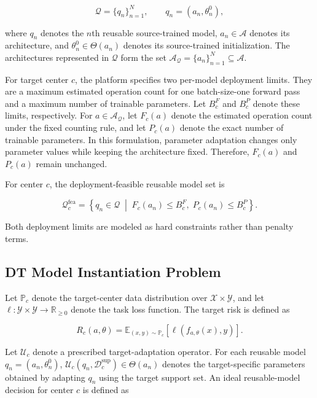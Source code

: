 \documentclass[a4paper,fleqn]{cas-sc}
\begin{document}
\begin{equation}
\mathcal{Q}=\{q_n\}_{n=1}^{N},
\qquad
q_n=(a_n,\theta_n^0),
\label{eq:reusable-models}
\end{equation}

where $q_n$ denotes the $n$th reusable source-trained model,
$a_n\in\mathcal{A}$ denotes its architecture, and
$\theta_n^0\in\Theta(a_n)$ denotes its source-trained initialization. The
architectures represented in $\mathcal{Q}$ form the set
$\mathcal{A}_{\mathcal{Q}}=\{a_n\}_{n=1}^{N}\subseteq\mathcal{A}$.

For target center $c$, the platform specifies two per-model deployment
limits. They are a maximum estimated operation count for one batch-size-one
forward pass and a maximum number of trainable parameters. Let $B_c^{F}$ and $B_c^{P}$
denote these limits, respectively. For $a\in\mathcal{A}_{\mathcal{Q}}$, let
$F_c(a)$ denote the estimated operation count under the fixed counting rule,
and let $P_c(a)$ denote the exact number of trainable parameters. In this
formulation, parameter adaptation changes only parameter values while keeping
the architecture fixed. Therefore, $F_c(a)$ and $P_c(a)$ remain unchanged.

For center $c$, the deployment-feasible reusable model set is

\begin{equation}
\mathcal{Q}_{c}^{\mathrm{fea}}
=
\left\{
q_n\in\mathcal{Q}
\;\middle|\;
F_c(a_n)\leq B_c^{F},
\;
P_c(a_n)\leq B_c^{P}
\right\}.
\label{eq:feasible-candidate-set}
\end{equation}

Both deployment limits are modeled as hard constraints rather than penalty
terms.

\subsection{DT Model Instantiation Problem}

Let $\mathbb{P}_c$ denote the target-center data distribution over
$\mathcal{X}\times\mathcal{Y}$, and let
$\ell:\mathcal{Y}\times\mathcal{Y}\rightarrow\mathbb{R}_{\geq 0}$ denote the
task loss function. The target risk is defined as

\begin{equation}
R_c(a,\theta)
=
\mathbb{E}_{(x,y)\sim\mathbb{P}_c}
\left[
\ell(f_{a,\theta}(x),y)
\right].
\label{eq:target-risk}
\end{equation}

Let $\mathcal{U}_c$ denote a prescribed target-adaptation operator. For each
reusable model $q_n=(a_n,\theta_n^0)$,
$\mathcal{U}_c(q_n,\mathcal{D}_c^{\mathrm{sup}})\in\Theta(a_n)$ denotes
the target-specific parameters obtained by adapting $q_n$ using the target
support set. An ideal reusable-model decision for center $c$ is defined as
\end{document}
